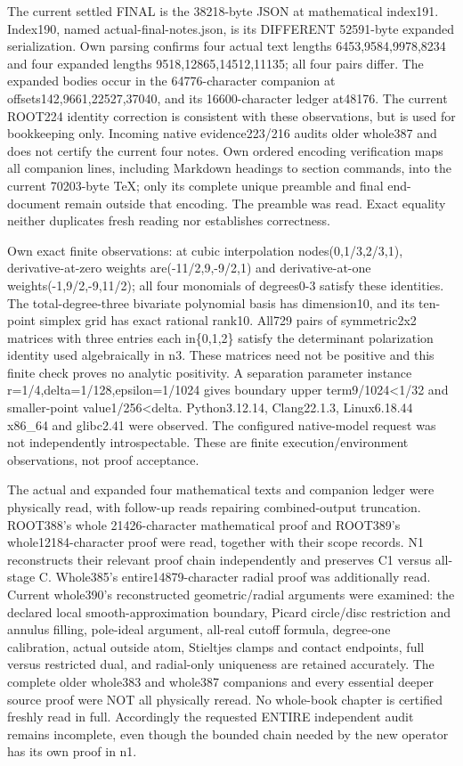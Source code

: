 \documentclass[11pt]{article}
\begin{document}
The current settled FINAL is the 38218-byte JSON at mathematical index191. Index190, named actual-final-notes.json, is its DIFFERENT 52591-byte expanded serialization. Own parsing confirms four actual text lengths 6453,9584,9978,8234 and four expanded lengths 9518,12865,14512,11135; all four pairs differ. The expanded bodies occur in the 64776-character companion at offsets142,9661,22527,37040, and its 16600-character ledger at48176. The current ROOT224 identity correction is consistent with these observations, but is used for bookkeeping only. Incoming native evidence223/216 audits older whole387 and does not certify the current four notes. Own ordered encoding verification maps all companion lines, including Markdown headings to section commands, into the current 70203-byte TeX; only its complete unique preamble and final end-document remain outside that encoding. The preamble was read. Exact equality neither duplicates fresh reading nor establishes correctness.

Own exact finite observations: at cubic interpolation nodes(0,1/3,2/3,1), derivative-at-zero weights are(-11/2,9,-9/2,1) and derivative-at-one weights(-1,9/2,-9,11/2); all four monomials of degrees0-3 satisfy these identities. The total-degree-three bivariate polynomial basis has dimension10, and its ten-point simplex grid has exact rational rank10. All729 pairs of symmetric2x2 matrices with three entries each in\{0,1,2\} satisfy the determinant polarization identity used algebraically in n3. These matrices need not be positive and this finite check proves no analytic positivity. A separation parameter instance r=1/4,delta=1/128,epsilon=1/1024 gives boundary upper term9/1024<1/32 and smaller-point value1/256<delta. Python3.12.14, Clang22.1.3, Linux6.18.44 x86\_64 and glibc2.41 were observed. The configured native-model request was not independently introspectable. These are finite execution/environment observations, not proof acceptance.

The actual and expanded four mathematical texts and companion ledger were physically read, with follow-up reads repairing combined-output truncation. ROOT388's whole 21426-character mathematical proof and ROOT389's whole12184-character proof were read, together with their scope records. N1 reconstructs their relevant proof chain independently and preserves C1 versus all-stage C. Whole385's entire14879-character radial proof was additionally read. Current whole390's reconstructed geometric/radial arguments were examined: the declared local smooth-approximation boundary, Picard circle/disc restriction and annulus filling, pole-ideal argument, all-real cutoff formula, degree-one calibration, actual outside atom, Stieltjes clamps and contact endpoints, full versus restricted dual, and radial-only uniqueness are retained accurately. The complete older whole383 and whole387 companions and every essential deeper source proof were NOT all physically reread. No whole-book chapter is certified freshly read in full. Accordingly the requested ENTIRE independent audit remains incomplete, even though the bounded chain needed by the new operator has its own proof in n1.
\end{document}
